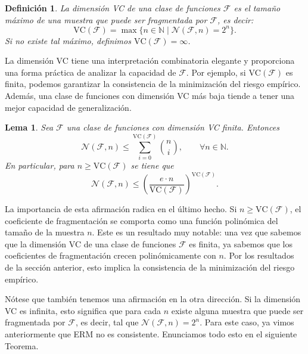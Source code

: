 \documentclass{report}
\newtheorem{lem}{Lema}[section]
\newtheorem{dfn}{Definición}[section]
\begin{document}
\begin{dfn}
La dimensión VC de una clase de funciones \(\mathcal{F}\) es el tamaño máximo de una muestra que puede ser fragmentada por \(\mathcal{F}\), es decir:
\[
\text{VC}(\mathcal{F}) = \max \{n \in \mathbb{N} \mid \mathcal{N}(\mathcal{F}, n) = 2^n\}. 
\]
Si no existe tal máximo, definimos \(\text{VC}(\mathcal{F}) = \infty\).\newline
\end{dfn}

La dimensión VC tiene una interpretación combinatoria 
elegante y proporciona una forma práctica de analizar la capacidad de \(\mathcal{F}\). Por ejemplo, si \(\text{VC}(\mathcal{F})\) 
es finita, podemos garantizar la consistencia de la minimización del riesgo empírico. Además, una clase de funciones 
con dimensión VC más baja tiende a tener una mejor capacidad de generalización.\newline

\begin{lem}\label{def:cota combinatoria de dimensión VC}
    Sea $\mathcal{F}$ una clase de funciones con dimensión VC finita. Entonces
    \[
    \mathcal{N}(\mathcal{F}, n) \leq \sum_{i=0}^{\text{VC}(\mathcal{F})} \binom{n}{i} , \qquad \forall n \in \mathbb{N}.
    \]
    En particular, para $n\geq \text{VC}(\mathcal{F})$ se tiene que 
    \[
    \mathcal{N}(\mathcal{F}, n) \leq \left(\frac{e\cdot n}{\text{VC}(\mathcal{F})}\right)^{\text{VC}(\mathcal{F})}.
    \]
\end{lem}

La importancia de esta afirmación radica en el último hecho. Si \( n \geq \text{VC}(\mathcal{F}) \), 
el coeficiente de fragmentación se comporta como una función polinómica del tamaño de la muestra \( n \). 
Este es un resultado muy notable: una vez que sabemos que la dimensión VC de una clase de funciones 
\(\mathcal{F}\) es finita, ya sabemos que los coeficientes de fragmentación crecen polinómicamente con \( n \). 
Por los resultados de la sección anterior, esto implica la consistencia de la minimización del riesgo empírico.\newline

Nótese que también tenemos una afirmación en la otra dirección. Si la dimensión VC es infinita, esto significa 
que para cada \( n \) existe alguna muestra que puede ser fragmentada por \(\mathcal{F}\), es decir, tal que
\(\mathcal{N}(\mathcal{F}, n) = 2^n. \) Para este caso, ya vimos anteriormente que ERM no es consistente.
Enunciamos todo esto en el siguiente Teorema.\newline
\end{document}
